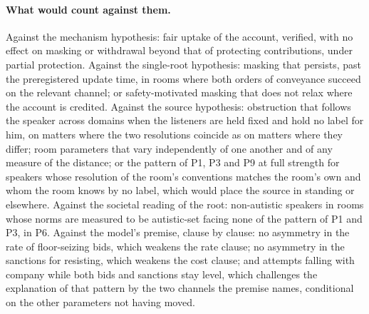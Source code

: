 \paragraph{What would count against them.} Against the mechanism hypothesis: fair uptake of the account, verified, with no effect on masking or withdrawal beyond that of protecting contributions, under partial protection. Against the single-root hypothesis: masking that persists, past the preregistered update time, in rooms where both orders of conveyance succeed on the relevant channel; or safety-motivated masking that does not relax where the account is credited. Against the source hypothesis: obstruction that follows the speaker across domains when the listeners are held fixed and hold no label for him, on matters where the two resolutions coincide as on matters where they differ; room parameters that vary independently of one another and of any measure of the distance; or the pattern of P1, P3 and P9 at full strength for speakers whose resolution of the room's conventions matches the room's own and whom the room knows by no label, which would place the source in standing or elsewhere. Against the societal reading of the root: non-autistic speakers in rooms whose norms are measured to be autistic-set facing none of the pattern of P1 and P3, in P6. Against the model's premise, clause by clause: no asymmetry in the rate of floor-seizing bids, which weakens the rate clause; no asymmetry in the sanctions for resisting, which weakens the cost clause; and attempts falling with company while both bids and sanctions stay level, which challenges the explanation of that pattern by the two channels the premise names, conditional on the other parameters not having moved.

